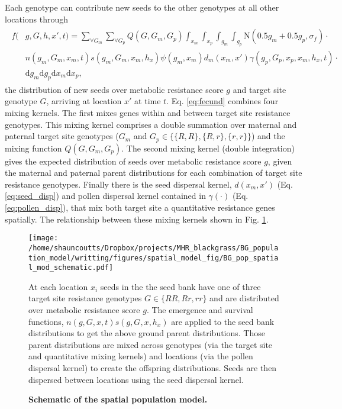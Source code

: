 \documentclass[10pt,letterpaper]{article}
\begin{document}
Each genotype can contribute new seeds to the other genotypes at all other locations through       
\begin{align}
\label{eq:fecund}
\begin{split}
	f(&g, G, h, x', t) = \displaystyle \sum_{\forall G_m}\sum_{\forall G_p} Q(G, G_m, G_p) \int_{x_m}\int_{x_p}\int_{g_m}\int_{g_p} \text{N}(0.5 g_m + 0.5 g_p, \sigma_f)\cdot\\
	&n(g_m, G_m, x_m, t)s(g_m, G_m, x_m, h_x) \psi(g_m, x_m) d_m(x_m, x') \gamma(g_p, G_p, x_p, x_m, h_x, t)\cdot\\
	&\text{d}g_m \text{d}g_p \text{d}x_m \text{d}x_p,
\end{split}
\end{align} 
the distribution of new seeds over metabolic resistance score $g$ and target site genotype $G$, arriving at location $x'$ at time $t$. Eq. \ref{eq:fecund} combines four mixing kernels. The first mixes genes within and between target site resistance genotypes. This mixing kernel comprises a double summation over maternal and paternal target site genotypes ($G_m$ and $G_p \in \{\{R, R\}, \{R, r\}, \{r, r\} \}$) and the mixing function $Q(G, G_m, G_p)$. The second mixing kernel (double integration) gives the expected distribution of seeds over metabolic resistance score $g$, given the maternal and paternal parent distributions for each combination of target site resistance genotypes. Finally there is the seed dispersal kernel, $d(x_m, x')$ (Eq. \ref{eq:seed_disp}) and pollen dispersal kernel contained in $\gamma(\cdot)$ (Eq. \ref{eq:pollen_disp}), that mix both target site a quantitative resistance genes spatially. The relationship between these mixing kernels shown in Fig. \ref{fig:schematic}. 

\begin{figure}[!h] 
	\texttt{[image: /home/shauncoutts/Dropbox/projects/MHR\_blackgrass/BG\_population\_model/writting/figures/spatial\_model\_fig/BG\_pop\_spatial\_mod\_schematic.pdf]}
\caption{\bf Schematic of the spatial population model.} At each location $x_i$ seeds in the the seed bank have one of three target site resistance genotypes $G \in \{RR, Rr, rr\}$ and are distributed over metabolic resistance score $g$. The emergence and survival functions, $n(g, G, x, t)s(g, G, x, h_x)$ are applied to the seed bank distributions to get the above ground parent distributions. Those parent distributions are mixed across genotypes (via the target site and quantitative mixing kernels) and locations (via the pollen dispersal kernel) to create the offspring distributions. Seeds are then dispersed between locations using the seed dispersal kernel.
\label{fig:schematic}
\end{figure}
\end{document}
